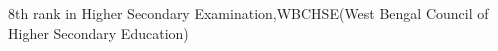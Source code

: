 %
%


\begin{scholarship}
					{8th rank in Higher Secondary Examination,WBCHSE(West Bengal Council of Higher Secondary Education)}
\end{scholarship}